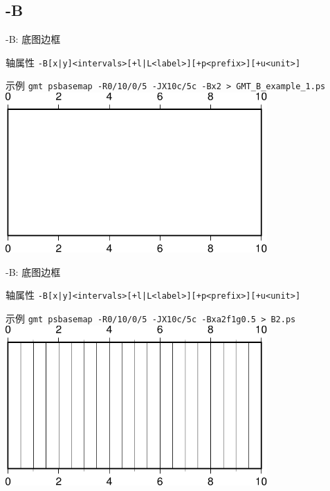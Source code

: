 \documentclass[UTF8, 11pt]{ctexbeamer}
\begin{document}
\subsection{-B}
\begin{frame}[fragile]{-B: 底图边框}
\begin{block}{轴属性}
\small{\verb!-B[x|y]<intervals>[+l|L<label>][+p<prefix>][+u<unit>]!}\pause
\end{block}
\begin{block}{示例}
\centering
\small\verb!gmt psbasemap -R0/10/0/5 -JX10c/5c -Bx2 > GMT_B_example_1.ps! \\[0.5cm]
\includegraphics[width=0.75\textwidth]{GMT_B_example_1}
\end{block}
\end{frame}

\begin{frame}[fragile]{-B: 底图边框}
\begin{block}{轴属性}
\small{\verb!-B[x|y]<intervals>[+l|L<label>][+p<prefix>][+u<unit>]!}
\end{block}
\begin{block}{示例}
\centering
\small\verb!gmt psbasemap -R0/10/0/5 -JX10c/5c -Bxa2f1g0.5 > B2.ps! \\[0.5cm]
\includegraphics[width=0.75\textwidth]{GMT_B_example_2}
\end{block}
\end{frame}
\end{document}
